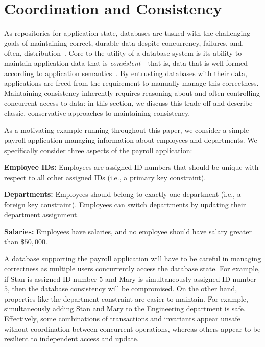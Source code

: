 
\section{Coordination and Consistency}
\label{sec:motivation}


As repositories for application state, databases are tasked with the
challenging goals of maintaining correct, durable data despite
concurrency, failures, and, often,
distribution~\cite{bernstein-book}. Core to the utility of a database
system is its ability to maintain application data that is
\textit{consistent}---that is, data that is well-formed according to
application semantics~\cite{gray-virtues}. By entrusting databases
with their data, applications are freed from the requirement to
manually manage this correctness. Maintaining consistency inherently
requires reasoning about and often controlling concurrent access to
data: in this section, we discuss this trade-off and describe classic,
conservative approaches to maintaining consistency.

 As a motivating example running throughout
this paper, we consider a simple payroll application managing
information about employees and departments. We specifically consider
three aspects of the payroll application:
\begin{myitemize}
\item\textbf{Employee IDs:} Employees are assigned ID numbers that
  should be unique with respect to all other assigned IDs (i.e., a
  primary key constraint).
  \item\textbf{Departments:} Employees should belong to exactly one
  department (i.e., a foreign key constraint). Employees can switch
  departments by updating their department assignment.
\item\textbf{Salaries:} Employees have salaries, and no employee
  should have salary greater than $\$50,000$.
\end{myitemize}
A database supporting the payroll application will have to be careful
in managing correctness as multiple users concurrently access the
database state. For example, if Stan is assigned ID number $5$ and
Mary is simultaneously assigned ID number $5$, then the database
consistency will be compromised. On the other hand, properties like
the department constraint are easier to maintain. For example,
simultaneously adding Stan and Mary to the Engineering department is
safe. Effectively, some combinations of transactions and invariants
appear unsafe without coordination between concurrent operations,
whereas others appear to be resilient to independent access and
update.

